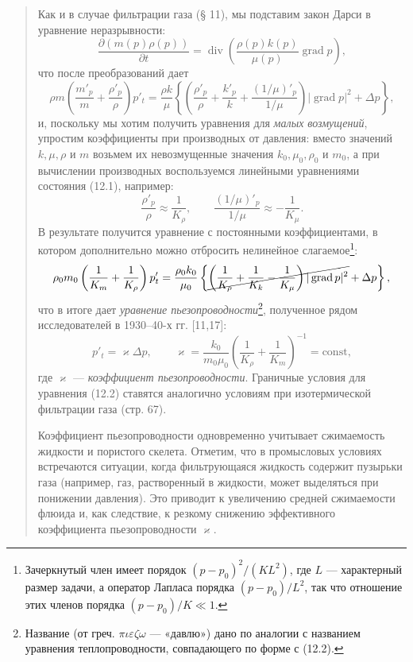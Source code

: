 \documentclass[12pt,a4paper]{article}
\DeclareMathOperator{\grad}{grad}
\DeclareMathOperator{\Div}{div}
\begin{document}
\begin{quote}\sloppy
Как и в случае фильтрации газа (§ 11), мы подставим закон Дарси в уравнение неразрывности:
\[
\frac{\partial(m(p)\rho(p))}{\partial t}=\Div\left(\frac{\rho(p)k(p)}{\mu(p)}\grad p\right),
\]
что после преобразований дает
\[
\rho m\left(\frac{m'_p}{m}+\frac{\rho'_p}{\rho}\right)p'_t=\frac{\rho k}{\mu}\left\{\left(\frac{\rho'_p}{\rho}+\frac{k'_p}{k}+\frac{(1/\mu)'_p}{1/\mu}\right)|\grad p|^2+\Delta p\right\},
\]
и, поскольку мы хотим получить уравнения для \textit{малых возмущений}, упростим коэффициенты при производных от давления: вместо значений $k,\mu,\rho$ и $m$ возьмем их невозмущенные значения $k_0,\mu_0,\rho_0$ и $m_0$, а при вычислении производных воспользуемся линейными уравнениями состояния (12.1), например:
\[
\frac{\rho'_p}{\rho}\approx\frac{1}{K_\rho},\qquad \frac{(1/\mu)'_p}{1/\mu}\approx-\frac{1}{K_\mu}.
\]
В результате получится уравнение с постоянными коэффициентами, в котором дополнительно можно отбросить нелинейное слагаемое\footnote{Зачеркнутый член имеет порядок $(p-p_0)^2/(KL^2)$, где $L$ --- характерный размер задачи, а оператор Лапласа порядка $(p-p_0)/L^2$, так что отношение этих членов порядка $(p-p_0)/K\ll1$.}:
\[
\rho_0m_0\left(\frac{1}{K_m}+\frac{1}{K_\rho}\right)p'_t=\frac{\rho_0k_0}{\mu_0}\left\{\cancel{\left(\frac{1}{K_\rho}+\frac{1}{K_k}-\frac{1}{K_\mu}\right)|\grad p|^2}+\Delta p\right\},
\]
что в итоге дает \textit{уравнение пьезопроводности}\footnote{Название (от греч. $\pi\iota\varepsilon\zeta\omega$ --- «давлю») дано по аналогии с названием уравнения теплопроводности, совпадающего по форме с (12.2).}, полученное рядом исследователей в 1930--40-х гг. [11,17]:
\begin{equation}
p'_t=\varkappa\Delta p,\qquad \varkappa=\frac{k_0}{m_0\mu_0}\left(\frac{1}{K_\rho}+\frac{1}{K_m}\right)^{-1}=\mathrm{const},\tag{12.2}\label{q8:eq-12-2}
\end{equation}
где $\varkappa$ --- \textit{коэффициент пьезопроводности}. Граничные условия для уравнения (12.2) ставятся аналогично условиям при изотермической фильтрации газа (стр. 67).

\setcounter{footnote}{0}
Коэффициент пьезопроводности одновременно учитывает сжимаемость жидкости и пористого скелета. Отметим, что в промысловых условиях встречаются ситуации, когда фильтрующаяся жидкость содержит пузырьки газа (например, газ, растворенный в жидкости, может выделяться при понижении давления). Это приводит к увеличению средней сжимаемости флюида и, как следствие, к резкому снижению эффективного коэффициента пьезопроводности $\varkappa$.
\par\nobreak{}\par
\end{quote}
\end{document}
